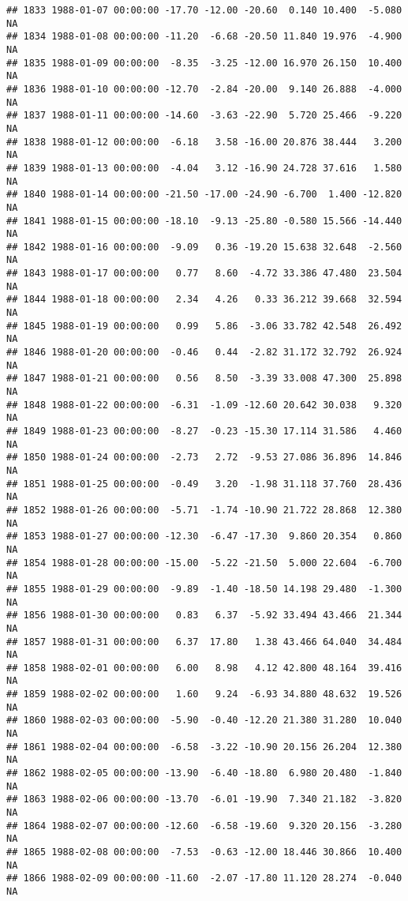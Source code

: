 \documentclass{article}\usepackage{graphicx, color}
\makeatletter
\newenvironment{kframe}{%
 \def\at@end@of@kframe{}%
 \ifinner\ifhmode%
  \def\at@end@of@kframe{\end{minipage}}%
  \begin{minipage}{\columnwidth}%
 \fi\fi%
 \def\FrameCommand##1{\hskip\@totalleftmargin \hskip-\fboxsep
 \colorbox{shadecolor}{##1}\hskip-\fboxsep
     \hskip-\linewidth \hskip-\@totalleftmargin \hskip\columnwidth}%
 \MakeFramed {\advance\hsize-\width
   \@totalleftmargin\z@ \linewidth\hsize
   \@setminipage}}%
 {\par\unskip\endMakeFramed%
 \at@end@of@kframe}
\newenvironment{knitrout}{}{} %
\makeatother
\begin{document}
\begin{knitrout}
\begin{kframe}
\begin{verbatim}
## 1833 1988-01-07 00:00:00 -17.70 -12.00 -20.60  0.140 10.400  -5.080     NA
## 1834 1988-01-08 00:00:00 -11.20  -6.68 -20.50 11.840 19.976  -4.900     NA
## 1835 1988-01-09 00:00:00  -8.35  -3.25 -12.00 16.970 26.150  10.400     NA
## 1836 1988-01-10 00:00:00 -12.70  -2.84 -20.00  9.140 26.888  -4.000     NA
## 1837 1988-01-11 00:00:00 -14.60  -3.63 -22.90  5.720 25.466  -9.220     NA
## 1838 1988-01-12 00:00:00  -6.18   3.58 -16.00 20.876 38.444   3.200     NA
## 1839 1988-01-13 00:00:00  -4.04   3.12 -16.90 24.728 37.616   1.580     NA
## 1840 1988-01-14 00:00:00 -21.50 -17.00 -24.90 -6.700  1.400 -12.820     NA
## 1841 1988-01-15 00:00:00 -18.10  -9.13 -25.80 -0.580 15.566 -14.440     NA
## 1842 1988-01-16 00:00:00  -9.09   0.36 -19.20 15.638 32.648  -2.560     NA
## 1843 1988-01-17 00:00:00   0.77   8.60  -4.72 33.386 47.480  23.504     NA
## 1844 1988-01-18 00:00:00   2.34   4.26   0.33 36.212 39.668  32.594     NA
## 1845 1988-01-19 00:00:00   0.99   5.86  -3.06 33.782 42.548  26.492     NA
## 1846 1988-01-20 00:00:00  -0.46   0.44  -2.82 31.172 32.792  26.924     NA
## 1847 1988-01-21 00:00:00   0.56   8.50  -3.39 33.008 47.300  25.898     NA
## 1848 1988-01-22 00:00:00  -6.31  -1.09 -12.60 20.642 30.038   9.320     NA
## 1849 1988-01-23 00:00:00  -8.27  -0.23 -15.30 17.114 31.586   4.460     NA
## 1850 1988-01-24 00:00:00  -2.73   2.72  -9.53 27.086 36.896  14.846     NA
## 1851 1988-01-25 00:00:00  -0.49   3.20  -1.98 31.118 37.760  28.436     NA
## 1852 1988-01-26 00:00:00  -5.71  -1.74 -10.90 21.722 28.868  12.380     NA
## 1853 1988-01-27 00:00:00 -12.30  -6.47 -17.30  9.860 20.354   0.860     NA
## 1854 1988-01-28 00:00:00 -15.00  -5.22 -21.50  5.000 22.604  -6.700     NA
## 1855 1988-01-29 00:00:00  -9.89  -1.40 -18.50 14.198 29.480  -1.300     NA
## 1856 1988-01-30 00:00:00   0.83   6.37  -5.92 33.494 43.466  21.344     NA
## 1857 1988-01-31 00:00:00   6.37  17.80   1.38 43.466 64.040  34.484     NA
## 1858 1988-02-01 00:00:00   6.00   8.98   4.12 42.800 48.164  39.416     NA
## 1859 1988-02-02 00:00:00   1.60   9.24  -6.93 34.880 48.632  19.526     NA
## 1860 1988-02-03 00:00:00  -5.90  -0.40 -12.20 21.380 31.280  10.040     NA
## 1861 1988-02-04 00:00:00  -6.58  -3.22 -10.90 20.156 26.204  12.380     NA
## 1862 1988-02-05 00:00:00 -13.90  -6.40 -18.80  6.980 20.480  -1.840     NA
## 1863 1988-02-06 00:00:00 -13.70  -6.01 -19.90  7.340 21.182  -3.820     NA
## 1864 1988-02-07 00:00:00 -12.60  -6.58 -19.60  9.320 20.156  -3.280     NA
## 1865 1988-02-08 00:00:00  -7.53  -0.63 -12.00 18.446 30.866  10.400     NA
## 1866 1988-02-09 00:00:00 -11.60  -2.07 -17.80 11.120 28.274  -0.040     NA

\end{verbatim}
\end{kframe}
\end{knitrout}
\end{document}
